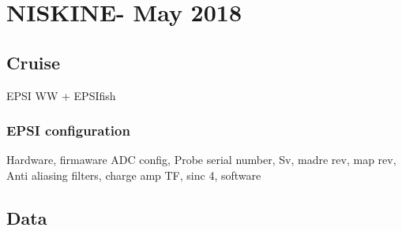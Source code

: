\chapter{NISKINE- May 2018}

\section{Cruise}
EPSI WW  + EPSIfish 
\subsection{EPSI configuration}
Hardware, firmaware
ADC config, Probe serial number, Sv, madre rev, map rev, Anti aliasing filters, charge amp TF, sinc 4, software


\section{Data}
